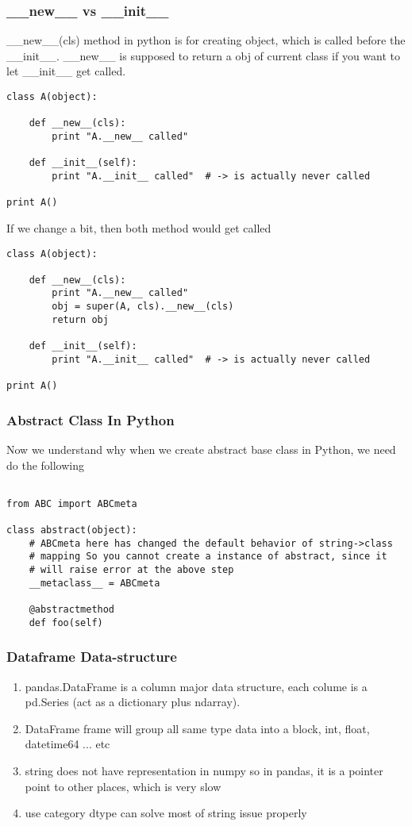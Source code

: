 \subsubsection{\_\_new\_\_ vs \_\_init\_\_}
\_\_new\_\_(cls) method in python is for creating object, which is called before the \_\_init\_\_. \_\_new\_\_ is supposed to return a obj of current class if you want to let \_\_init\_\_ get called.
\begin{lstlisting}
class A(object):

    def __new__(cls):
        print "A.__new__ called"

    def __init__(self):
        print "A.__init__ called"  # -> is actually never called

print A()
\end{lstlisting}

If we change a bit, then both method would get called
\begin{lstlisting}
class A(object):

    def __new__(cls):
        print "A.__new__ called"
        obj = super(A, cls).__new__(cls)
        return obj

    def __init__(self):
        print "A.__init__ called"  # -> is actually never called

print A()
\end{lstlisting}

\subsubsection{Abstract Class In Python}
Now we understand why when we create abstract base class in Python, we need do the following
\begin{lstlisting}

from ABC import ABCmeta

class abstract(object):
    # ABCmeta here has changed the default behavior of string->class
    # mapping So you cannot create a instance of abstract, since it
    # will raise error at the above step
    __metaclass__ = ABCmeta

    @abstractmethod
    def foo(self)

\end{lstlisting}



\subsubsection{Dataframe Data-structure}
\begin{enumerate}
\item pandas.DataFrame is a column major data structure, each colume is a pd.Series (act as a dictionary plus ndarray).
\item DataFrame frame will group all same type data into a block, int, float, datetime64 ... etc
\item string does not have representation in numpy so in pandas, it is a pointer point to other places, which is very slow
\item use {\color{red}category} dtype can solve most of string issue properly
\end{enumerate}

